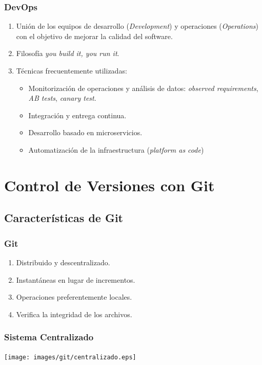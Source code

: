 \documentclass[hanbdout,a4paper,slidestop,dvips,xcolor=pst,blue]{beamer}
\begin{document}
\begin{frame}[c]
	\frametitle{DevOps}
	\begin{enumerate}[<+->]
	   \item Unión de los equipos de desarrollo (\emph{Development}) y operaciones (\emph{Operations}) con el objetivo de mejorar la calidad del software.
       \item Filosofía \emph{you build it, you run it}.
       \item Técnicas frecuentemente utilizadas:
            \begin{itemize}
                \item Monitorización de operaciones y análisis de datos: \emph{observed requirements}, \emph{AB tests}, \emph{canary test}.
                \item Integración y entrega continua.
                \item Desarrollo basado en microservicios.
                \item Automatización de la infraestructura (\emph{platform as code})
            \end{itemize}
    \end{enumerate}	
\end{frame}

\section{Control de Versiones con Git}

\subsection{Características de Git}

\begin{frame}[c]
	\frametitle{Git}
	 \begin{enumerate}[<+->]
        \item Distribuido y descentralizado.
        \item Instantáneas en lugar de incrementos.
        \item Operaciones preferentemente locales.
        \item Verifica la integridad de los archivos.
	 \end{enumerate}
\end{frame}

\begin{frame}[c]
	\frametitle{Sistema Centralizado}
	 \begin{center}
		\texttt{[image: images/git/centralizado.eps]}
	 \end{center}
\end{frame}
\end{document}
